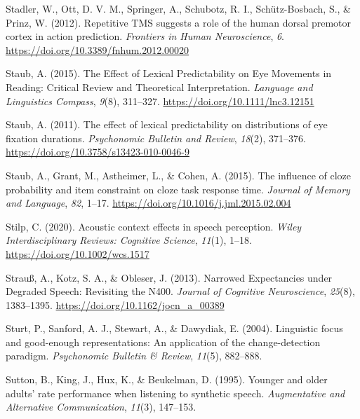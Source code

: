 \documentclass[a4paper, nobind]{templates/ociamthesis}
\newlength{\cslhangindent}
\newenvironment{CSLReferences}[2] %
 {%
  \setlength{\parindent}{0pt}
  \ifodd #1
  \let\oldpar\par
  \def\par{\hangindent=\cslhangindent\oldpar}
  \fi
  \setlength{\parskip}{1mm}
  \setlength{\baselineskip}{6mm}
 }%
 {}
\begin{document}
\begin{CSLReferences}{1}{0}
\leavevmode{}%
Stadler, W., Ott, D. V. M., Springer, A., Schubotz, R. I., Schütz-Bosbach, S., \& Prinz, W. (2012). Repetitive TMS suggests a role of the human dorsal premotor cortex in action prediction. \emph{Frontiers in Human Neuroscience}, \emph{6}. \url{https://doi.org/10.3389/fnhum.2012.00020}

\leavevmode{}%
Staub, A. (2015). The Effect of Lexical Predictability on Eye Movements in Reading: Critical Review and Theoretical Interpretation. \emph{Language and Linguistics Compass}, \emph{9}(8), 311--327. \url{https://doi.org/10.1111/lnc3.12151}

\leavevmode{}%
Staub, A. (2011). {The effect of lexical predictability on distributions of eye fixation durations}. \emph{Psychonomic Bulletin and Review}, \emph{18}(2), 371--376. \url{https://doi.org/10.3758/s13423-010-0046-9}

\leavevmode{}%
Staub, A., Grant, M., Astheimer, L., \& Cohen, A. (2015). {The influence of cloze probability and item constraint on cloze task response time}. \emph{Journal of Memory and Language}, \emph{82}, 1--17. \url{https://doi.org/10.1016/j.jml.2015.02.004}

\leavevmode{}%
Stilp, C. (2020). {Acoustic context effects in speech perception}. \emph{Wiley Interdisciplinary Reviews: Cognitive Science}, \emph{11}(1), 1--18. \url{https://doi.org/10.1002/wcs.1517}

\leavevmode{}%
Strauß, A., Kotz, S. A., \& Obleser, J. (2013). Narrowed Expectancies under Degraded Speech: Revisiting the N400. \emph{Journal of Cognitive Neuroscience}, \emph{25}(8), 1383--1395. \url{https://doi.org/10.1162/jocn_a_00389}

\leavevmode{}%
Sturt, P., Sanford, A. J., Stewart, A., \& Dawydiak, E. (2004). Linguistic focus and good-enough representations: An application of the change-detection paradigm. \emph{Psychonomic Bulletin \& Review}, \emph{11}(5), 882--888.

\leavevmode{}%
Sutton, B., King, J., Hux, K., \& Beukelman, D. (1995). Younger and older adults' rate performance when listening to synthetic speech. \emph{Augmentative and Alternative Communication}, \emph{11}(3), 147--153.


\end{CSLReferences}
\end{document}
